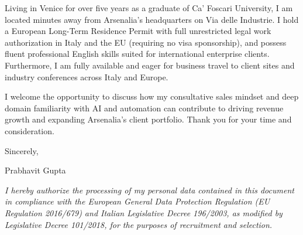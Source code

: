 \documentclass[10pt,a4paper]{article}
\begin{document}
Living in Venice for over five years as a graduate of Ca' Foscari University, I am located minutes away from Arsenalia's headquarters on Via delle Industrie. I hold a European Long-Term Residence Permit with full unrestricted legal work authorization in Italy and the EU (requiring no visa sponsorship), and possess fluent professional English skills suited for international enterprise clients. Furthermore, I am fully available and eager for business travel to client sites and industry conferences across Italy and Europe.

I welcome the opportunity to discuss how my consultative sales mindset and deep domain familiarity with AI and automation can contribute to driving revenue growth and expanding Arsenalia's client portfolio. Thank you for your time and consideration.

Sincerely,

Prabhavit Gupta

\vspace{1em}
\footnotesize
\textit{I hereby authorize the processing of my personal data contained in this document in compliance with the European General Data Protection Regulation (EU Regulation 2016/679) and Italian Legislative Decree 196/2003, as modified by Legislative Decree 101/2018, for the purposes of recruitment and selection.}
\end{document}
